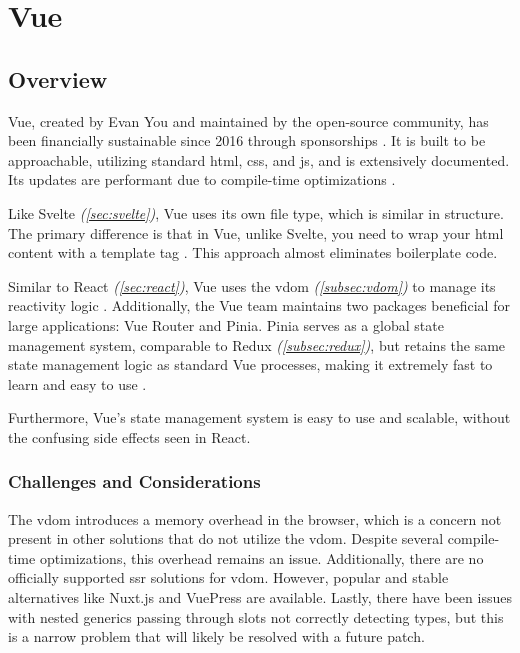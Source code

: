 \section{Vue}
\label{sec:vue}

\subsection{Overview}
\label{subsec:vue:overview}

Vue, created by Evan You and maintained by the open-source community, has been financially sustainable since 2016 through sponsorships \cite{vue:sponsor,vue:faq}. It is built to be approachable, utilizing standard \acrshort{html}, \acrshort{css}, and \acrshort{js}, and is extensively documented. Its updates are performant due to compile-time optimizations \cite{vue:home}.

Like Svelte \textit{(\ref{sec:svelte})}, Vue uses its own file type, which is similar in structure. The primary difference is that in Vue, unlike Svelte, you need to wrap your \acrshort{html} content with a template tag \cite{svelte:components, vue:template_syntax}. This approach almost eliminates boilerplate code.

Similar to React \textit{(\ref{sec:react})}, Vue uses the \acrshort{vdom} \textit{(\ref{subsec:vdom})} to manage its reactivity logic \cite{react:vdom,vue:rendering_mechanism}. Additionally, the Vue team maintains two packages beneficial for large applications: Vue Router and Pinia. Pinia serves as a global state management system, comparable to Redux \textit{(\ref{subsec:redux})}, but retains the same state management logic as standard Vue processes, making it extremely fast to learn and easy to use \cite{vue:router,vue:pinia}.

Furthermore, Vue's state management system is easy to use and scalable, without the confusing side effects seen in React.

\subsubsection{Challenges and Considerations}
\label{subsec:vue:challenges}

The \acrshort{vdom} introduces a memory overhead in the browser, which is a concern not present in other solutions that do not utilize the \acrshort{vdom}. Despite several compile-time optimizations, this overhead remains an issue. Additionally, there are no officially supported \acrshort{ssr} solutions for \acrshort{vdom}. However, popular and stable alternatives like Nuxt.js and VuePress are available. Lastly, there have been issues with nested generics passing through slots not correctly detecting types, but this is a narrow problem that will likely be resolved with a future patch.

